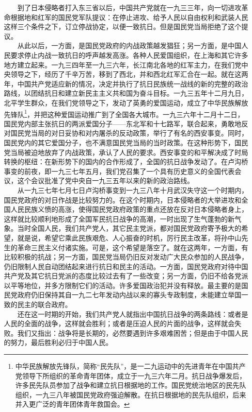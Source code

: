 \documentclass[cn,11pt,chinese]{elegantbook}
\begin{document}
　　到了日本侵略者打入东三省以后，中国共产党就在一九三三年，向一切进攻革命根据地和红军的国民党军队提议：在停止进攻、给予人民以自由权利和武装人民这样三个条件之下，订立停战协定，以便一致抗日。但是国民党当局拒绝了这个提议。\\
　　从此以后，一方面，是国民党政府的内战政策越发猖狂；另一方面，是中国人民要求停止内战一致抗日的呼声越发高涨。各种人民爱国组织，在上海和其它许多地方建立起来。一九三四年至一九三六年，长江南北各地的红军主力，在我们党中央领导之下，经历了千辛万苦，移到了西北，并和西北红军汇合在一起。就在这两年，中国共产党适应新的情况，决定并执行了抗日民族统一战线的新的完整的政治路线，以团结抗日和建立新民主主义共和国为奋斗目标。一九三五年十二月九日，北平学生群众，在我们党领导之下，发动了英勇的爱国运动，成立了中华民族解放先锋队\footnote[6]{ 中华民族解放先锋队，简称“民先队”，是一二九运动中的先进青年在中国共产党领导下所组织的革命青年团体，成立于一九三六年二月。抗日战争爆发后，许多民先队员参加了战争和建立抗日根据地的工作。国民党统治地区的民先队组织，一九三八年被国民党政府强迫解散。在抗日根据地的民先队组织，后来并入更广泛的青年团体青年救国会。}，并把这种爱国运动推广到了全国各大城市。一九三六年十二月十二日，国民党内部主张抗日的两派爱国分子——东北军和十七路军，联合起来，勇敢地反对国民党当局的对日妥协和对内屠杀的反动政策，举行了有名的西安事变。同时，国民党内的其它爱国分子，也不满意国民党当局的当时政策。在这种形势下，国民党当局被迫地放弃了内战政策，承认了人民的要求。西安事变的和平解决成了时局转换的枢纽：在新形势下的国内的合作形成了，全国的抗日战争发动了。在卢沟桥事变的前夜，即一九三七年五月，我们党召集了一个具有历史意义的全国代表会议，这个会议批准了党中央自一九三五年以来的新的政治路线。\\
　　从一九三七年七月七日卢沟桥事变到一九三八年十月武汉失守这一个时期内，国民党政府的对日作战是比较努力的。在这个时期内，日本侵略者的大举进攻和全国人民民族义愤的高涨，使得国民党政府政策的重点还放在反对日本侵略者身上，这样就比较顺利地形成了全国军民抗日战争的高潮，一时出现了生气蓬勃的新气象。当时全国人民，我们共产党人，其它民主党派，都对国民党政府寄予极大的希望，就是说，希望它乘此民族艰危、人心振奋的时机，厉行民主改革，将孙中山先生的革命三民主义付诸实施。可是，这个希望是落空了。就在这两年，一方面，有比较积极的抗战；另一方面，国民党当局仍旧反对发动广大民众参加的人民战争，仍旧限制人民自动团结起来进行抗日和民主的活动。一方面，国民党政府对待中国共产党及其它抗日党派的态度比较过去有了一些改变；另一方面，仍旧不给各党派以平等地位，并多方限制它们的活动。许多爱国政治犯并没有释放。最主要的是国民党政府仍旧保持其自一九二七年发动内战以来的寡头专政制度，未能建立举国一致的民主的联合政府。\\
　　还在这一时期的开始，我们共产党人就指出中国抗日战争的两条路线：或者是人民的全面的战争，这样就会胜利；或者是压迫人民的片面的战争，这样就会失败。我们又指出：战争将是长期的，必然要遇到许多艰难困苦；但是由于中国人民的努力，最后胜利必归于中国人民。\\
\end{document}
